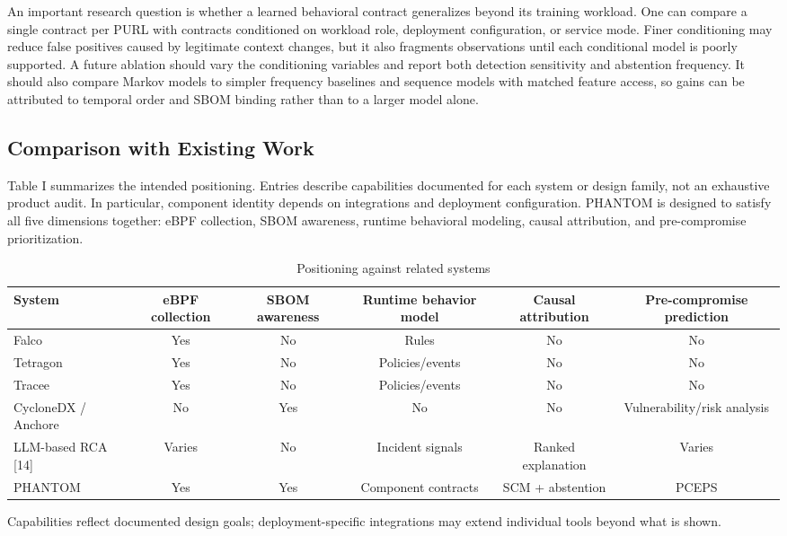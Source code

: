 \documentclass[conference]{IEEEtran}
\begin{document}
An important research question is whether a learned behavioral contract generalizes beyond its training workload. One can compare a single contract per PURL with contracts conditioned on workload role, deployment configuration, or service mode. Finer conditioning may reduce false positives caused by legitimate context changes, but it also fragments observations until each conditional model is poorly supported. A future ablation should vary the conditioning variables and report both detection sensitivity and abstention frequency. It should also compare Markov models to simpler frequency baselines and sequence models with matched feature access, so gains can be attributed to temporal order and SBOM binding rather than to a larger model alone.

\subsection{Comparison with Existing Work}
Table I summarizes the intended positioning. Entries describe capabilities documented for each system or design family, not an exhaustive product audit. In particular, component identity depends on integrations and deployment configuration. PHANTOM is designed to satisfy all five dimensions together: eBPF collection, SBOM awareness, runtime behavioral modeling, causal attribution, and pre-compromise prioritization.
\begin{table}[t]\caption{Positioning against related systems}\label{tab:positioning}\centering
\begin{tabular}{lccccc}\toprule
System & eBPF collection & SBOM awareness & Runtime behavior model & Causal attribution & Pre-compromise prediction\\\midrule
Falco & Yes & No & Rules & No & No\\
Tetragon & Yes & No & Policies/events & No & No\\
Tracee & Yes & No & Policies/events & No & No\\
CycloneDX / Anchore & No & Yes & No & No & Vulnerability/risk analysis\\
LLM-based RCA [14] & Varies & No & Incident signals & Ranked explanation & Varies\\
PHANTOM & Yes & Yes & Component contracts & SCM + abstention & PCEPS\\\bottomrule
\end{tabular}
\par{\footnotesize Capabilities reflect documented design goals; deployment-specific integrations may extend individual tools beyond what is shown.}
\end{table}
\end{document}
